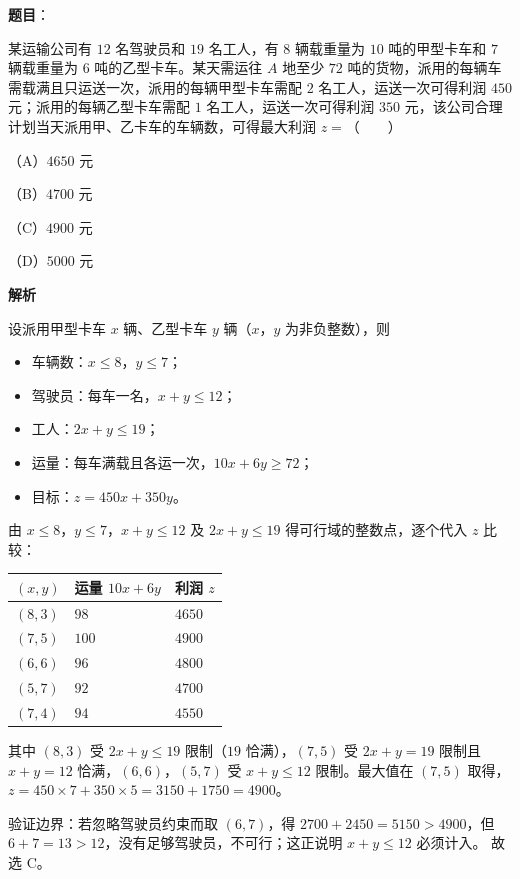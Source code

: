 \begin{answer}

\textbf{题目}：

某运输公司有 $12$ 名驾驶员和 $19$ 名工人，有 $8$ 辆载重量为 $10$ 吨的甲型卡车和 $7$ 辆载重量为 $6$ 吨的乙型卡车。某天需运往 $A$ 地至少 $72$ 吨的货物，派用的每辆车需载满且只运送一次，派用的每辆甲型卡车需配 $2$ 名工人，运送一次可得利润 $450$ 元；派用的每辆乙型卡车需配 $1$ 名工人，运送一次可得利润 $350$ 元，该公司合理计划当天派用甲、乙卡车的车辆数，可得最大利润 $z=$\mbox{（　　）}

（A）$4650$ 元

（B）$4700$ 元

（C）$4900$ 元

（D）$5000$ 元

\textbf{解析}

设派用甲型卡车 $x$ 辆、乙型卡车 $y$ 辆（$x$，$y$ 为非负整数），则

\begin{itemize}
\item 车辆数：$x\leqslant8$，$y\leqslant7$；
\item 驾驶员：每车一名，$x+y\leqslant12$；
\item 工人：$2x+y\leqslant19$；
\item 运量：每车满载且各运一次，$10x+6y\geqslant72$；
\item 目标：$z=450x+350y$。
\end{itemize}

由 $x\leqslant8$，$y\leqslant7$，$x+y\leqslant12$ 及 $2x+y\leqslant19$ 得可行域的整数点，逐个代入 $z$ 比较：

\begin{center}
\begin{tabular}{lll}
\toprule
$(x,y)$ & 运量 $10x+6y$ & 利润 $z$ \\
\midrule
$(8,3)$ & $98$ & $4650$ \\
$(7,5)$ & $100$ & $4900$ \\
$(6,6)$ & $96$ & $4800$ \\
$(5,7)$ & $92$ & $4700$ \\
$(7,4)$ & $94$ & $4550$ \\
\bottomrule
\end{tabular}
\end{center}

其中 $(8,3)$ 受 $2x+y\leqslant19$ 限制（$19$ 恰满），$(7,5)$ 受 $2x+y=19$ 限制且 $x+y=12$ 恰满，$(6,6)$，$(5,7)$ 受 $x+y\leqslant12$ 限制。最大值在 $(7,5)$ 取得，$z=450\times7+350\times5=3150+1750=4900$。

验证边界：若忽略驾驶员约束而取 $(6,7)$，得 $2700+2450=5150>4900$，但 $6+7=13>12$，没有足够驾驶员，不可行；这正说明 $x+y\leqslant12$ 必须计入。
故选 C。


\end{answer}
